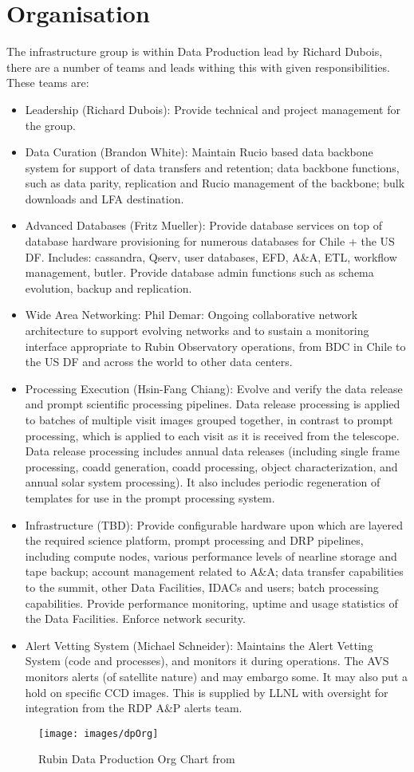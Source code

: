 \section{Organisation} \label{sec:org}

The infrastructure group is within Data Production lead by Richard Dubois, there are a number of teams and leads withing this
with given responsibilities. These teams are:
\begin{itemize}
\item Leadership (Richard Dubois): Provide technical and project management for the group.
\item {Data Curation (Brandon White): Maintain Rucio based data backbone system for support of data transfers and retention; data backbone functions, such as data parity, replication and Rucio management of the backbone; bulk downloads and LFA destination.}
\item {Advanced Databases (Fritz Mueller): Provide database services on top of database hardware provisioning for numerous databases for Chile + the US DF. Includes: cassandra, Qserv, user databases, EFD, A\&A, ETL, workflow management, butler. Provide database admin functions such as schema evolution, backup and replication.}
\item {Wide Area Networking: Phil Demar: Ongoing collaborative network
    architecture to support evolving networks and to sustain a
    monitoring interface appropriate to Rubin Observatory operations,
    from BDC in Chile to the US DF and across the world to other data
    centers.}
  \item {Processing Execution (Hsin-Fang Chiang): Evolve and verify the data release and prompt scientific processing pipelines. Data release processing is applied to batches of multiple visit images grouped together, in contrast to prompt processing, which is applied to each visit as it is received from the telescope. Data release processing includes annual data releases (including single frame processing, coadd generation, coadd processing, object characterization, and annual solar system processing). It also includes periodic regeneration of templates for use in the prompt processing system.}
\item {Infrastructure (TBD): Provide configurable hardware upon which are layered the required science platform, prompt processing and DRP pipelines, including compute nodes, various performance levels of nearline storage and tape backup; account management related to A\&A; data transfer capabilities to the summit, other Data Facilities, IDACs and users; batch processing capabilities. Provide performance monitoring, uptime and usage statistics of the Data Facilities. Enforce network security.}
\item {Alert Vetting System (Michael Schneider): Maintains the Alert
    Vetting System (code and processes), and monitors it during
    operations. The AVS monitors alerts (of satellite nature) and may
    embargo some. It may also put a hold on specific CCD images. This
    is supplied by LLNL with oversight for integration from the RDP A\&P alerts team.}
\end{itemize}



\begin{figure}
\begin{centering}
\texttt{[image: images/dpOrg]}
	\caption{Rubin Data Production Org Chart from \cite{RTN-001}\label{fig:dporg}}
\end{centering}
\end{figure}
